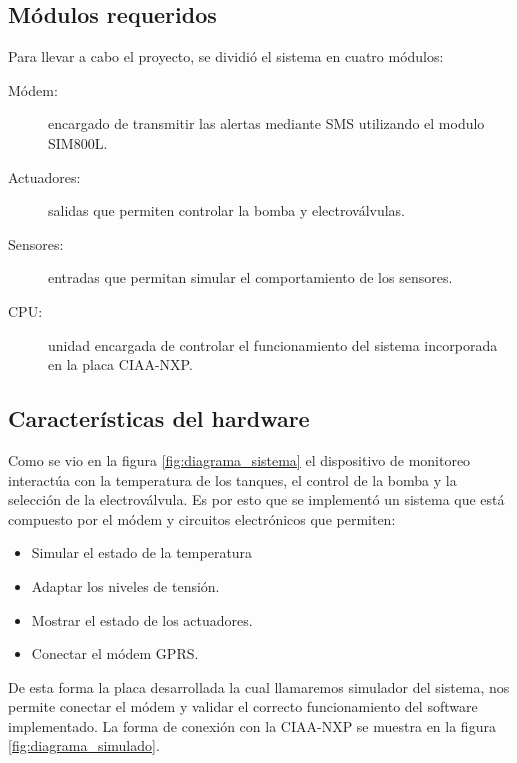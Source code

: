 \subsection{ Módulos requeridos}
Para llevar a cabo el proyecto, se dividió el sistema en cuatro módulos:
\begin{description}
  \item[Módem:] encargado de transmitir las alertas mediante SMS utilizando el modulo SIM800L.
  \item[Actuadores:] salidas que permiten controlar la bomba y electroválvulas.
  \item[Sensores:] entradas que permitan simular el comportamiento de los sensores.
  \item[CPU:] unidad encargada de controlar el funcionamiento del sistema incorporada en la placa CIAA-NXP. 
\end{description}

\subsection{Características del hardware}
\label{hw_placa}

Como se vio en la figura \ref{fig:diagrama_sistema} el dispositivo de monitoreo interactúa con la temperatura de los tanques, el control de la bomba y la selección de la electroválvula. Es por esto que se implementó un sistema que está compuesto por el módem y circuitos electrónicos que permiten:
\begin{itemize}
  \item Simular el estado de la temperatura
  \item Adaptar los niveles de tensión.
  \item Mostrar el estado de los actuadores.
  \item Conectar el módem GPRS.
\end{itemize}

    De esta forma la placa desarrollada la cual llamaremos simulador del sistema, nos permite conectar el módem y validar el correcto funcionamiento del software implementado. La forma de conexión con la CIAA-NXP se muestra en la figura \ref{fig:diagrama_simulado}.

